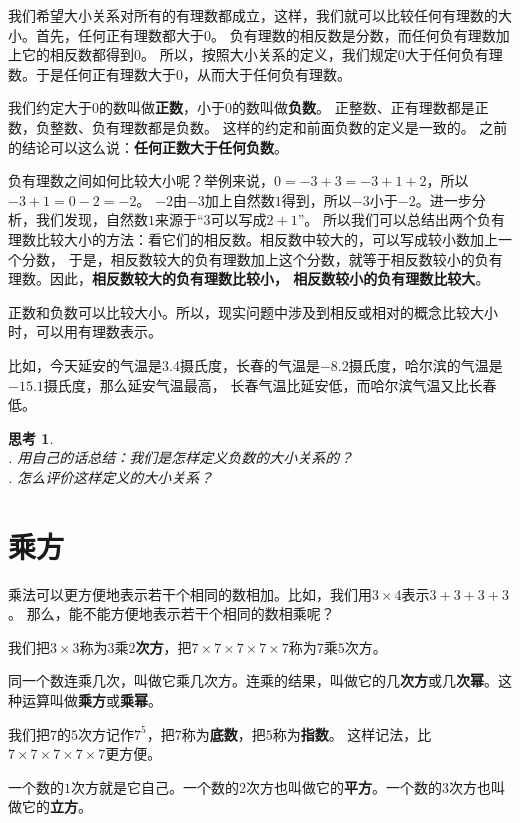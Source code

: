 \documentclass[12pt,UTF8]{ctexbook}
\theoremstyle{definition}
\theoremstyle{plain}
\newtheorem{sk}{思考}[section]
\begin{document}
我们希望大小关系对所有的有理数都成立，这样，我们就可以比较任何有理数的大小。首先，任何正有理数都大于$0$。
负有理数的相反数是分数，而任何负有理数加上它的相反数都得到$0$。
所以，按照大小关系的定义，我们规定$0$大于任何负有理数。于是任何正有理数大于$0$，从而大于任何负有理数。

我们约定大于$0$的数叫做\textbf{正数}，小于$0$的数叫做\textbf{负数}。
正整数、正有理数都是正数，负整数、负有理数都是负数。
这样的约定和前面负数的定义是一致的。
之前的结论可以这么说：\textbf{任何正数大于任何负数}。

负有理数之间如何比较大小呢？举例来说，$0 = -3 + 3 = -3 + 1 + 2$，所以$-3 + 1 = 0 - 2 = -2$。
$-2$由$-3$加上自然数$1$得到，所以$-3$小于$-2$。进一步分析，我们发现，自然数$1$来源于“$3$可以写成$2+1$”。
所以我们可以总结出两个负有理数比较大小的方法：看它们的相反数。相反数中较大的，可以写成较小数加上一个分数，
于是，相反数较大的负有理数加上这个分数，就等于相反数较小的负有理数。因此，\textbf{相反数较大的负有理数比较小，
相反数较小的负有理数比较大}。

正数和负数可以比较大小。所以，现实问题中涉及到相反或相对的概念比较大小时，可以用有理数表示。

比如，今天延安的气温是$3.4$摄氏度，长春的气温是$-8.2$摄氏度，哈尔滨的气温是$-15.1$摄氏度，那么延安气温最高，
长春气温比延安低，而哈尔滨气温又比长春低。

\begin{sk}\label{sk:0-1-0}
    \mbox{}\\
    . 用自己的话总结：我们是怎样定义负数的大小关系的？\\
    . 怎么评价这样定义的大小关系？
\end{sk}

\section{乘方}
乘法可以更方便地表示若干个相同的数相加。比如，我们用$3 \times 4$表示$3+3+3+3$。
那么，能不能方便地表示若干个相同的数相乘呢？

我们把$3\times 3$称为$3$乘$2$\textbf{次方}，把$7\times 7\times 7\times 7\times 7$称为$7$乘$5$次方。

同一个数连乘几次，叫做它乘几次方。连乘的结果，叫做它的几\textbf{次方}或几\textbf{次幂}。这种运算叫做\textbf{乘方}或\textbf{乘幂}。

我们把$7$的$5$次方记作$7^5$，把$7$称为\textbf{底数}，把$5$称为\textbf{指数}。
这样记法，比$7\times 7\times 7\times 7\times 7$更方便。

一个数的$1$次方就是它自己。一个数的$2$次方也叫做它的\textbf{平方}。一个数的$3$次方也叫做它的\textbf{立方}。
\end{document}
